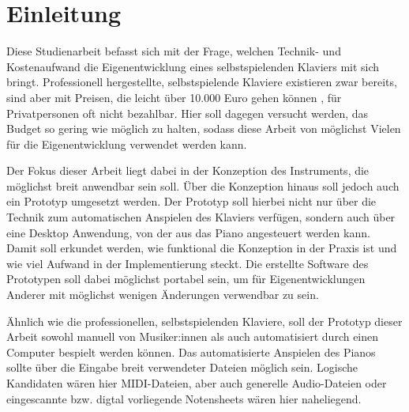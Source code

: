 
\chapter{Einleitung} \label{einleitung}

\nocite{*}

Diese Studienarbeit befasst sich mit der Frage, welchen Technik- und Kostenaufwand die Eigenentwicklung eines selbstspielenden Klaviers mit sich bringt.
Professionell hergestellte, selbstspielende Klaviere existieren zwar bereits, sind aber mit Preisen, die leicht über 10.000 Euro gehen können \cite{YamahaU1}, für Privatpersonen oft nicht bezahlbar.
Hier soll dagegen versucht werden, das Budget so gering wie möglich zu halten, sodass diese Arbeit von möglichst Vielen für die Eigenentwicklung verwendet werden kann.

Der Fokus dieser Arbeit liegt dabei in der Konzeption des Instruments, die möglichst breit anwendbar sein soll. %
Über die Konzeption hinaus soll jedoch auch ein Prototyp umgesetzt werden.
Der Prototyp soll hierbei nicht nur über die Technik zum automatischen Anspielen des Klaviers verfügen, sondern auch über eine Desktop Anwendung, von der aus das Piano angesteuert werden kann.
Damit soll erkundet werden, wie funktional die Konzeption in der Praxis ist und wie viel Aufwand in der Implementierung steckt.
Die erstellte Software des Prototypen soll dabei möglichst portabel sein, um für Eigenentwicklungen Anderer mit möglichst wenigen Änderungen verwendbar zu sein.

Ähnlich wie die professionellen, selbstspielenden Klaviere, soll der Prototyp dieser Arbeit sowohl manuell von Musiker:innen als auch automatisiert durch einen Computer bespielt werden können.
Das automatisierte Anspielen des Pianos sollte über die Eingabe breit verwendeter Dateien möglich sein.
Logische Kandidaten wären hier \ac{MIDI}-Dateien, aber auch generelle Audio-Dateien oder eingescannte bzw. digtal vorliegende Notensheets wären hier naheliegend.

